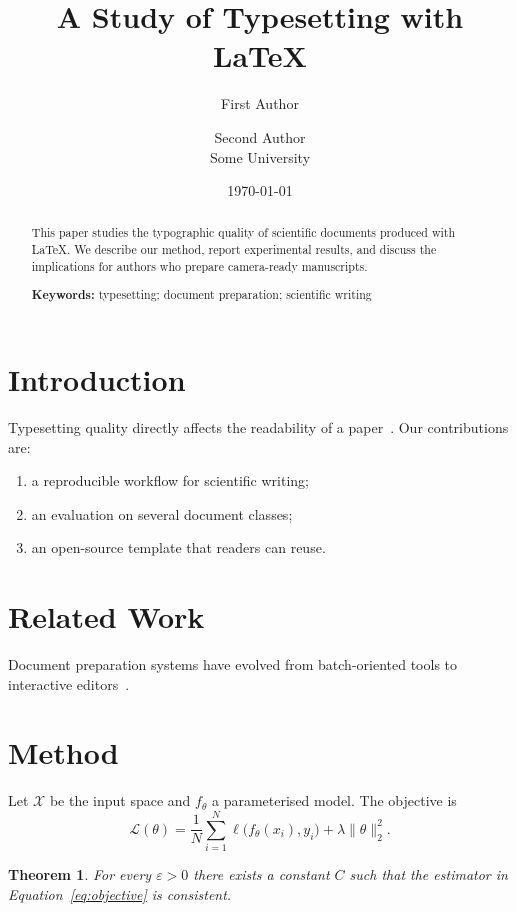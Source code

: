 \documentclass[11pt]{article}
\title{A Study of Typesetting with \LaTeX}
\author{First Author \and Second Author \\ Some University}
\date{\today}
\newtheorem{theorem}{Theorem}
\begin{document}
\maketitle

\begin{abstract}
  This paper studies the typographic quality of scientific documents produced
  with \LaTeX{}. We describe our method, report experimental results, and
  discuss the implications for authors who prepare camera-ready manuscripts.

  \textbf{Keywords:} typesetting; document preparation; scientific writing
\end{abstract}

\section{Introduction}
\label{sec:intro}

Typesetting quality directly affects the readability of a paper~\cite{knuth1984tex}.
Our contributions are:
\begin{enumerate}
  \item a reproducible workflow for scientific writing;
  \item an evaluation on several document classes;
  \item an open-source template that readers can reuse.
\end{enumerate}

\section{Related Work}
\label{sec:related}

Document preparation systems have evolved from batch-oriented tools to
interactive editors~\cite{lamport1994latex}.

\section{Method}
\label{sec:method}

Let $\mathcal{X}$ be the input space and $f_\theta$ a parameterised model.
The objective is
\begin{equation}
  \mathcal{L}(\theta) = \frac{1}{N}\sum_{i=1}^{N} \ell\bigl(f_\theta(x_i), y_i\bigr) + \lambda \lVert \theta \rVert_2^2 .
  \label{eq:objective}
\end{equation}

\begin{theorem}
  For every $\varepsilon > 0$ there exists a constant $C$ such that the
  estimator in Equation~\eqref{eq:objective} is consistent.
\end{theorem}
\end{document}

